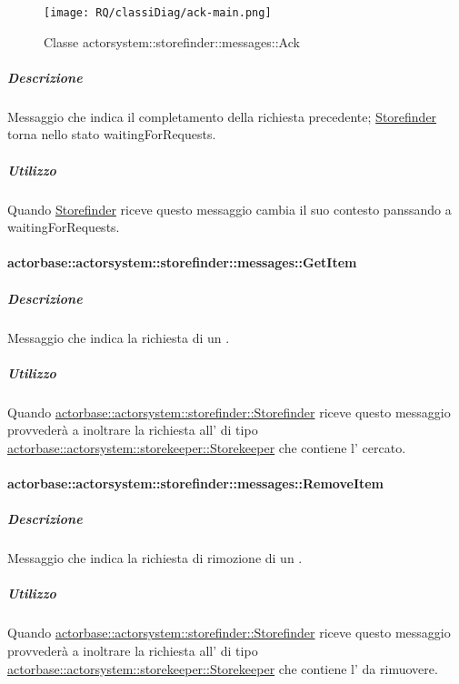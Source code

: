 \documentclass{scalatekids-article}
\begin{document}
\begin{figure}[H]
  \begin{center}
    \texttt{[image: RQ/classiDiag/ack-main.png]}
    \caption{Classe actorsystem::storefinder::messages::Ack}
  \end{center}
\end{figure}

\subparagraph{Descrizione}

Messaggio che indica il completamento della richiesta precedente;
\hyperref[sec:actorbase::actorsystem::storefinder::Storefinder]{Storefinder} torna nello stato waitingForRequests.

\subparagraph{Utilizzo}

Quando \hyperref[sec:actorbase::actorsystem::storefinder::Storefinder]{Storefinder}
riceve questo messaggio cambia il suo contesto panssando a waitingForRequests.

\paragraph{actorbase::actorsystem::storefinder::messages::GetItem}
\label{sec:actorbase::actorsystem::storefinder::messages::GetItem}

\subparagraph{Descrizione}

Messaggio che indica la richiesta di un .

\subparagraph{Utilizzo}

Quando \hyperref[sec:actorbase::actorsystem::storefinder::Storefinder]{actorbase::\allowbreak{}actorsystem::\allowbreak{}storefinder::\allowbreak{}Storefinder}
riceve questo messaggio provvederà a inoltrare la richiesta all' di tipo
\hyperref[sec:actorbase::actorsystem::storekeeper::Storekeeper]{actorbase::\allowbreak{}actorsystem::\allowbreak{}storekeeper::\allowbreak{}Storekeeper}
che contiene l' cercato.

\paragraph{actorbase::actorsystem::storefinder::messages::RemoveItem}
\label{sec:actorbase::actorsystem::storefinder::messages::RemoveItem}

\subparagraph{Descrizione}

Messaggio che indica la richiesta di rimozione di un .

\subparagraph{Utilizzo}

Quando \hyperref[sec:actorbase::actorsystem::storefinder::Storefinder]{actorbase::\allowbreak{}actorsystem::\allowbreak{}storefinder::\allowbreak{}Storefinder}
riceve questo messaggio provvederà a inoltrare la richiesta all' di tipo
\hyperref[sec:actorbase::actorsystem::storekeeper::Storekeeper]{actorbase::\allowbreak{}actorsystem::\allowbreak{}storekeeper::\allowbreak{}Storekeeper}
che contiene l' da rimuovere.
\end{document}
